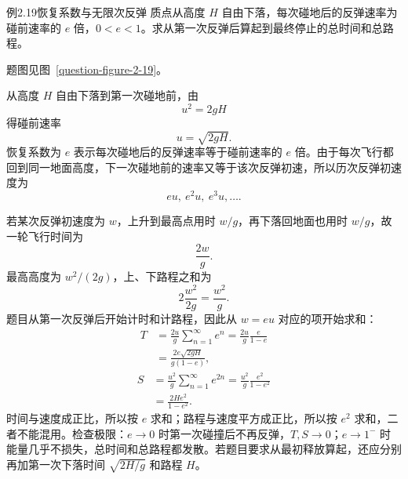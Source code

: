 \begin{origexamplebox}{例2.19\quad 恢复系数与无限次反弹}
质点从高度 $H$ 自由下落，每次碰地后的反弹速率为碰前速率的 $e$ 倍，$0<e<1$。求从第一次反弹后算起到最终停止的总时间和总路程。
\par 题图见图~\ref{question-figure-2-19}。
\KQuestionAT
\end{origexamplebox}
\begin{xesolution}
从高度 $H$ 自由下落到第一次碰地前，由
\[
u^2=2gH
\]
得碰前速率
\[
u=\sqrt{2gH}.
\]
恢复系数为 $e$ 表示每次碰地后的反弹速率等于碰前速率的 $e$ 倍。由于每次飞行都回到同一地面高度，下一次碰地前的速率又等于该次反弹初速，所以历次反弹初速度为
\[
eu,\ e^2u,\ e^3u,\ldots.
\]

若某次反弹初速度为 $w$，上升到最高点用时 $w/g$，再下落回地面也用时 $w/g$，故一轮飞行时间为
\[
\frac{2w}{g}.
\]
最高高度为 $w^2/(2g)$，上、下路程之和为
\[
2\frac{w^2}{2g}=\frac{w^2}{g}.
\]
题目从第一次反弹后开始计时和计路程，因此从 $w=eu$ 对应的项开始求和：
\BounceDiagram
\[
\begin{aligned}
T&=\frac{2u}{g}\sum_{n=1}^{\infty}e^n
=\frac{2u}{g}\frac{e}{1-e}\\
&=\boxed{\frac{2e\sqrt{2gH}}{g(1-e)}},
\end{aligned}
\]
\[
\begin{aligned}
S&=\frac{u^2}{g}\sum_{n=1}^{\infty}e^{2n}
=\frac{u^2}{g}\frac{e^2}{1-e^2}\\
&=\boxed{\frac{2He^2}{1-e^2}}.
\end{aligned}
\]
时间与速度成正比，所以按 $e$ 求和；路程与速度平方成正比，所以按 $e^2$ 求和，二者不能混用。检查极限：$e\to0$ 时第一次碰撞后不再反弹，$T,S\to0$；$e\to1^-$ 时能量几乎不损失，总时间和总路程都发散。若题目要求从最初释放算起，还应分别再加第一次下落时间 $\sqrt{2H/g}$ 和路程 $H$。
\end{xesolution}

